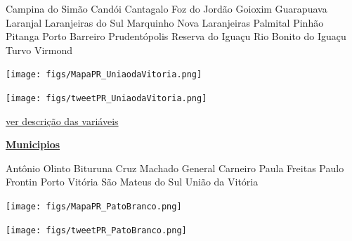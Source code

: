\documentclass[10pt]{article} %
\begin{document}
\begin{minipage}[t]{.30\linewidth}
\begin{mdframed}[style=sidebar,frametitle={}]
\begin{itemize}
\gsquare Campina do Simão 
\gsquare Candói 
\gsquare Cantagalo 
\gsquare Foz do Jordão 
\gsquare Goioxim 
\gsquare Guarapuava 
\gsquare Laranjal 
\gsquare Laranjeiras do Sul 
\gsquare Marquinho 
\gsquare Nova Laranjeiras 
\gsquare Palmital 
\gsquare Pinhão 
\gsquare Pitanga 
\gsquare Porto Barreiro 
\gsquare Prudentópolis 
\gsquare Reserva do Iguaçu 
\gsquare Rio Bonito do Iguaçu 
\gsquare Turvo 
\gsquare Virmond 
\end{itemize}\BackToContents\end{mdframed}\hfill\end{minipage}\newpage\begin{minipage}[t]{.66\linewidth}
\hypertarget{UndV}{}
\texttt{[image: figs/MapaPR\_UniaodaVitoria.png]}\vspace{0.5cm}\vspace{0.5cm}\begin{center}
\texttt{[image: figs/tweetPR\_UniaodaVitoria.png]}\end{center}
\begin{center}

\end{center}
\small{\hyperlink{vartab}{ver descrição das variáveis}}\end{minipage}\hfill\begin{minipage}[t]{.30\linewidth}
\begin{mdframed}[style=sidebar,frametitle={}]
\textbf{\hyperlink{municips}{Municipios}}\begin{itemize}\gsquare Antônio Olinto 
\gsquare Bituruna 
\gsquare Cruz Machado 
\gsquare General Carneiro 
\gsquare Paula Freitas 
\gsquare Paulo Frontin 
\gsquare Porto Vitória 
\gsquare São Mateus do Sul 
\gsquare União da Vitória 
\end{itemize}\BackToContents\end{mdframed}\hfill\end{minipage}\newpage\begin{minipage}[t]{.66\linewidth}
\hypertarget{PtBr}{}
\texttt{[image: figs/MapaPR\_PatoBranco.png]}\vspace{0.5cm}\vspace{0.5cm}\begin{center}
\texttt{[image: figs/tweetPR\_PatoBranco.png]}\end{center}

\end{minipage}
\end{document}
